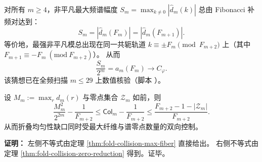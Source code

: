 \begin{conjecture}\label{conj:fold-fourier-fibonacci-extremizer}
对所有 \(m\ge 4\)，非平凡最大频谱幅度
\(
S_m=\max_{k\ne 0}|\widehat d_m(k)|
\)
总由 Fibonacci 补频对达到：
\[
S_m=|\widehat d_m(F_m)|=|\widehat d_m(F_{m+1})|.
\]
等价地，最强非平凡模总出现在同一共轭轨道
\(
k\equiv\pm F_m\pmod{F_{m+2}}
\)
上（其中 \(F_{m+1}\equiv -F_m\ (\mathrm{mod}\ F_{m+2})\)）。
从而
\[
\frac{S_m}{2^m}=a_m(F_m)\longrightarrow C_\varphi.
\]
该猜想已在全频扫描 \(m\le 29\) 上数值核验（脚本 ）。
\end{conjecture}

\begin{theorem}[碰撞缺口的双向夹逼]
\label{thm:fold-collision-sandwich}
设 $M_m:=\max_r d_m(r)$ 与零点集合 $\mathcal{Z}_m$ 如前，则
\[
\frac{M_m^2}{2^{2m}}-\frac{1}{F_{m+2}}
\le
\mathsf{Col}_m-\frac{1}{F_{m+2}}
\le
\frac{F_{m+2}-1-|\mathcal{Z}_m|}{F_{m+2}}.
\]
从而折叠均匀性缺口同时受最大纤维与谱零点数量的双向控制。
\end{theorem}

\textbf{证明：}
左侧不等式由定理 \ref{thm:fold-collision-max-fiber} 直接给出。
右侧不等式由定理 \ref{thm:fold-collision-zero-reduction} 得到。证毕。

